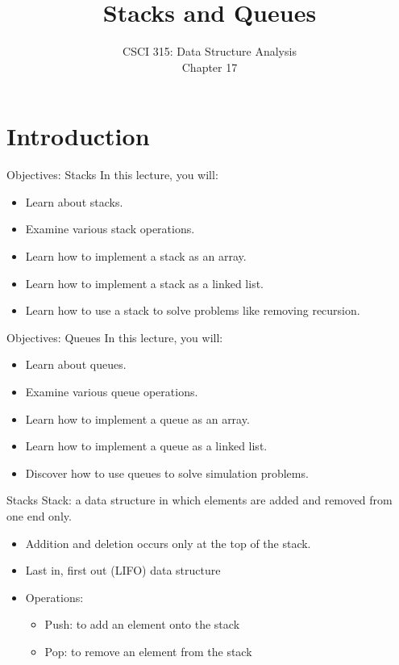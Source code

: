 \documentclass[14pt,aspectratio=1610]{beamer}
\title{\Huge{} Stacks and Queues}
\subtitle{CSCI 315: Data Structure Analysis\\Chapter 17}
\institute{Charleston Southern University}
\begin{document}
\begin{frame}
  \titlepage{}
\end{frame}

\section{Introduction}

\begin{frame}{Objectives: Stacks}
In this lecture, you will:
\begin{itemize}
\item
  Learn about stacks.
\item
  Examine various stack operations.
\item
  Learn how to implement a stack as an array.
\item
  Learn how to implement a stack as a linked list.
\item
  Learn how to use a stack to solve problems like removing recursion.
\end{itemize}
\end{frame}

\begin{frame}{Objectives: Queues}
In this lecture, you will:
\begin{itemize}
\item
  Learn about queues.
\item
  Examine various queue operations.
\item
  Learn how to implement a queue as an array.
\item
  Learn how to implement a queue as a linked list.
\item
  Discover how to use queues to solve simulation problems.
\end{itemize}
\end{frame}

\begin{frame}{Stacks}
Stack: a data structure in which elements are added and removed from one end only.

\begin{itemize}
\item
  Addition and deletion occurs only at the top of the stack.
\item
  Last in, first out (LIFO) data structure
\item
  Operations:
  \begin{itemize}
  \item
    Push: to add an element onto the stack
  \item
    Pop: to remove an element from the stack
  \end{itemize}
\end{itemize}
\end{frame}
\end{document}
